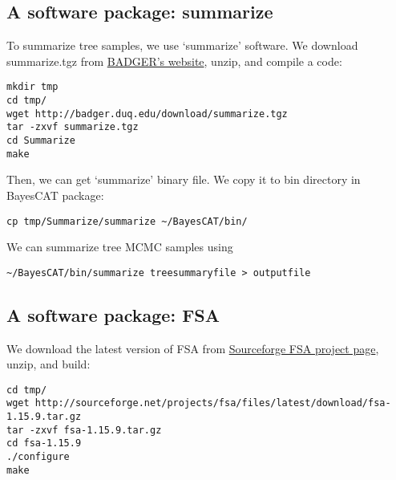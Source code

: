 \documentclass[11pt]{article}
\begin{document}
\subsection{A software package: summarize}
\label{sec-3-1}
To summarize tree samples, we use `summarize' software. 
We download summarize.tgz from \href{http://badger.duq.edu/download/index.html}{BADGER's website}, unzip, and compile a code: 
\begin{lstlisting}
mkdir tmp
cd tmp/
wget http://badger.duq.edu/download/summarize.tgz
tar -zxvf summarize.tgz
cd Summarize
make
\end{lstlisting}
Then, we can get `summarize' binary file. We copy it to bin directory in BayesCAT package:
\begin{lstlisting}
cp tmp/Summarize/summarize ~/BayesCAT/bin/
\end{lstlisting}

We can summarize tree MCMC samples using 
\begin{lstlisting}
~/BayesCAT/bin/summarize treesummaryfile > outputfile
\end{lstlisting}

\subsection{A software package: FSA}
\label{sec-3-2}
We download the latest version of FSA from \href{http://sourceforge.net/projects/fsa/}{Sourceforge FSA project page}, unzip, and build:
\begin{lstlisting}
cd tmp/
wget http://sourceforge.net/projects/fsa/files/latest/download/fsa-1.15.9.tar.gz
tar -zxvf fsa-1.15.9.tar.gz
cd fsa-1.15.9
./configure
make
\end{lstlisting}
\end{document}

